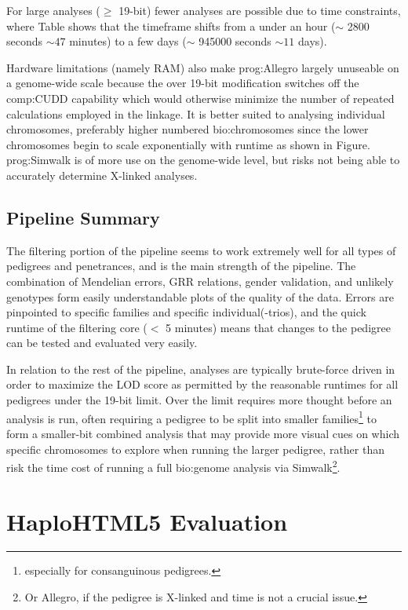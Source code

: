 For large analyses ($\geq$ 19-bit) fewer analyses are possible due to time constraints, where Table shows that the timeframe shifts from a under an hour ($\sim$ 2800 seconds $\sim 47$ minutes) to a few days ($\sim$ 945000 seconds $\sim 11$ days). 

Hardware limitations (namely RAM) also make \gls{prog:Allegro} largely unuseable on a genome-wide scale because the over 19-bit modification switches off the \gls{comp:CUDD} capability which would otherwise minimize the number of repeated calculations employed in the linkage. It is better suited to analysing individual chromosomes, preferably higher numbered \gls{bio:chromosomes} since the lower chromosomes begin to scale exponentially with runtime as shown in Figure. \gls{prog:Simwalk} is of more use on the genome-wide level, but risks not being able to accurately determine X-linked analyses.


\subsection{Pipeline Summary}

The filtering portion of the pipeline seems to work extremely well for all types of pedigrees and penetrances, and is the main strength of the pipeline. The combination of Mendelian errors, GRR relations, gender validation, and unlikely genotypes form easily understandable plots of the quality of the data. Errors are pinpointed to specific families and specific individual(-trios), and the quick runtime of the filtering core ($<$ 5 minutes) means that changes to the pedigree can be tested and evaluated very easily. 

In relation to the rest of the pipeline, analyses are typically brute-force driven in order to maximize the LOD score as permitted by the reasonable runtimes for all pedigrees under the 19-bit limit. Over the limit requires more thought before an analysis is run, often requiring a pedigree to be split into smaller families\footnote{especially for consanguinous pedigrees.} to form a smaller-bit combined analysis that may provide more visual cues on which specific chromosomes to explore when running the larger pedigree, rather than risk the time cost of running a full \gls{bio:genome} analysis via Simwalk\footnote{Or Allegro, if the pedigree is X-linked and time is not a crucial issue.}.


\section{HaploHTML5 Evaluation}

